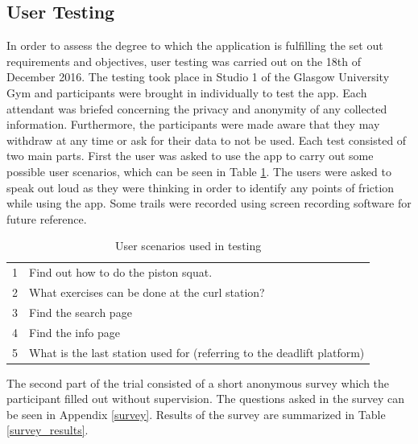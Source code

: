 \documentclass{l4proj}
\begin{document}
\subsection{User Testing}
In order to assess the degree to which the application is fulfilling the set out requirements and objectives, user testing was carried out on the 18th of December 2016. The testing took place in Studio 1 of the Glasgow University Gym and participants were brought in individually to test the app. Each attendant was briefed concerning the privacy and anonymity of any collected information. Furthermore, the participants were made aware that they may withdraw at any time or ask for their data to not be used. Each test consisted of two main parts. First the user was asked to use the app to carry out some possible user scenarios, which can be seen in Table \ref{test_scenarios}. The users were asked to speak out loud as they were thinking in order to identify any points of friction while using the app. Some trails were recorded using screen recording software for future reference.

\begin{table}[h]
\centering
\caption{User scenarios used in testing}
\label{test_scenarios}
\begin{tabular}{ll}
1 & Find out how to do the piston squat.\\
2 & What exercises can be done at the curl station? \\
3 & Find the search page \\
4 & Find the info page \\
5 & What is the last station used for (referring to the deadlift platform)
\end{tabular}
\end{table}

The second part of the trial consisted of a short anonymous survey which the participant filled out without supervision. The questions asked in the survey can be seen in Appendix \ref{survey}. Results of the survey are summarized in Table \ref{survey_results}.
\end{document}
